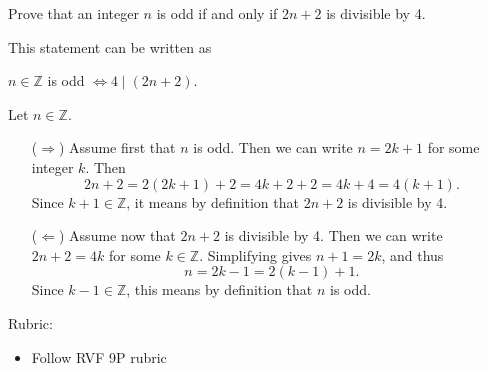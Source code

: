 \documentclass{article}
\theoremstyle{definition}
\begin{document}
\begin{question}{9}
    Prove that an integer $n$ is odd if and only if $2n+2$ is divisible by 4.
\end{question}
\begin{solution}
    This statement can be written as 
	\begin{center}
		$n \in \mathbb{Z}$ is odd $\iff 4 \mid (2n+2)$.
	\end{center}
	Let $n\in\mathbb{Z}$.
\begin{itemize}	
    \item[($\Rightarrow$)] Assume first that $n$ is odd. Then we can write $n = 2k+1$ for some integer $k$. Then
	\[
	2 n + 2 = 2 (2k + 1) + 2 = 4 k + 2 + 2 = 4 k + 4 = 4 (k+1).
	\]
	Since $k+1 \in \mathbb{Z}$, it means by definition that $2 n + 2$ is divisible by 4.
	
    \item[($\Leftarrow$)] Assume now that $2n + 2$ is divisible by 4. 
    Then we can write $2n + 2 = 4k$ for some $k \in \mathbb{Z}$. Simplifying gives $n + 1 = 2k$, and thus
	\[
	n = 2 k - 1 = 2 (k - 1) + 1.
	\]
    Since $k - 1 \in \mathbb{Z}$, this means by definition that $n$ is odd.
    
    
\end{itemize}
{\color{red} Rubric:
\begin{itemize}
\item Follow RVF 9P rubric 
\end{itemize}}
\end{solution}
\end{document}
